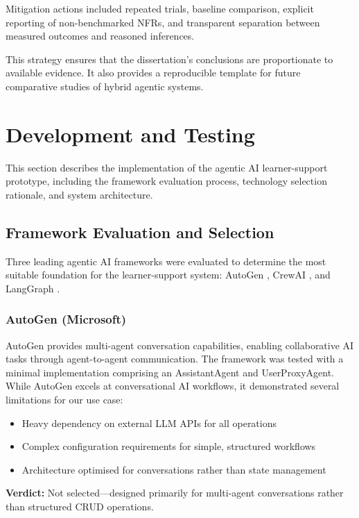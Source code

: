 \documentclass[12pt]{article}
\begin{document}
Mitigation actions included repeated trials, baseline comparison, explicit reporting of non-benchmarked NFRs, and transparent separation between measured outcomes and reasoned inferences.

This strategy ensures that the dissertation's conclusions are proportionate to available evidence. It also provides a reproducible template for future comparative studies of hybrid agentic systems.

\section{Development and Testing}
\label{sec:implementation}

This section describes the implementation of the agentic AI learner-support prototype, including the framework evaluation process, technology selection rationale, and system architecture.

\subsection{Framework Evaluation and Selection}

Three leading agentic AI frameworks were evaluated to determine the most suitable foundation for the learner-support system: AutoGen \parencite{autogen2023}, CrewAI \parencite{crewai2024}, and LangGraph \parencite{langgraph2024}.

\subsubsection{AutoGen (Microsoft)}
AutoGen provides multi-agent conversation capabilities, enabling collaborative AI tasks through agent-to-agent communication. The framework was tested with a minimal implementation comprising an AssistantAgent and UserProxyAgent. While AutoGen excels at conversational AI workflows, it demonstrated several limitations for our use case:
\begin{itemize}
    \item Heavy dependency on external LLM APIs for all operations
    \item Complex configuration requirements for simple, structured workflows
    \item Architecture optimised for conversations rather than state management
\end{itemize}
\textbf{Verdict:} Not selected---designed primarily for multi-agent conversations rather than structured CRUD operations.
\end{document}
